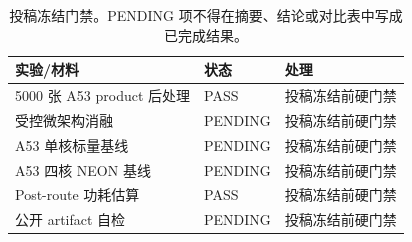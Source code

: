 \begin{table}[t]
\centering
\caption{投稿冻结门禁。PENDING 项不得在摘要、结论或对比表中写成已完成结果。}
\label{tab:freeze-gates}
\footnotesize
\begin{tabular}{lll}
\toprule
实验/材料 & 状态 & 处理 \\
\midrule
5000 张 A53 product 后处理 & PASS & 投稿冻结前硬门禁 \\
受控微架构消融 & PENDING & 投稿冻结前硬门禁 \\
A53 单核标量基线 & PENDING & 投稿冻结前硬门禁 \\
A53 四核 NEON 基线 & PENDING & 投稿冻结前硬门禁 \\
Post-route 功耗估算 & PASS & 投稿冻结前硬门禁 \\
公开 artifact 自检 & PENDING & 投稿冻结前硬门禁 \\
\bottomrule
\end{tabular}
\end{table}

